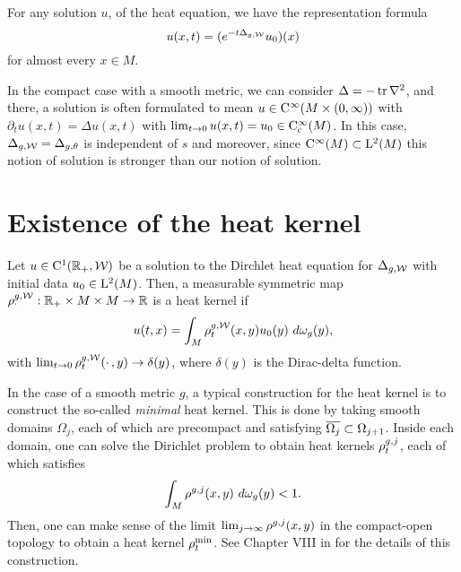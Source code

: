 \documentclass[a4paper, 12pt]{amsart}
\begin{document}
For any solution \(u\), of the heat equation, we have the representation formula
\[
u(x,t) = (e^{-t \Delta_{g,\cW}}u_0)(x)
\]
for almost every $x \in M$.
 
\begin{rem}
In the compact case with a smooth metric, we can consider $\Delta = -\tr \nabla^2$,
and there,  a solution is often formulated to mean $u \in \Ck{\infty}( M \times (0, \infty))$
with $\partial_t u(x,t) = \Delta u(x,t)$ with 
$\lim_{t \to 0} u(x,t) = u_0 \in \Ck[c]{\infty}(M)$.
In this case, $\Delta_{g,\cW} = \Delta_{g,\theta}$ is independent
of $s$ and moreover, since $\Ck{\infty}(M) \subset \Lp{2}(M)$
this notion of solution is stronger than our notion of solution.

\end{rem}

\section{Existence of the heat kernel}

\begin{defn}
Let $u \in \Ck{1}(\R_+, \cW)$ be a solution to the 
Dirchlet heat equation
for $\Delta_{g,\cW}$ with initial data $u_0 \in \Lp{2}(M)$. Then, a 
measurable symmetric map $\hk^{g,\cW}_{\mdot}: \R_+ \times M \times M \to \R$
is a heat kernel if 
$$u(t,x) = \int_{M} \hk^{g,\cW}_t(x,y) u_0(y)\ d\omega_g(y),$$
with $\lim_{t \to 0} \hk_t^{g,\cW}(\mdot,y) \to \delta(y)$, 
where $\delta(y)$ is the Dirac-delta function.
\end{defn}

In the case of a smooth metric $g$, a typical construction for
the heat kernel is to construct the so-called \emph{minimal} heat kernel.
This is done by taking smooth domains $\Omega_j$, 
each of which are precompact and satisfying $\close{\Omega_j} \subset \Omega_{j+1}$. 
Inside each domain, one can solve the Dirichlet problem
to obtain heat kernels $\hk^{g,j}_{t}$, each of which
satisfies 
$$ \int_{M} \hk^{g,j}(x,y)\ d\omega_g(y) < 1.$$
Then, one can make sense of the limit $\lim_{j \to \infty} \hk^{g,j}(x,y)$
in the compact-open topology to obtain a heat kernel $\hk^{\min}_t$.
See Chapter VIII in \cite{Chavel} for the details
of this construction.
\end{document}
